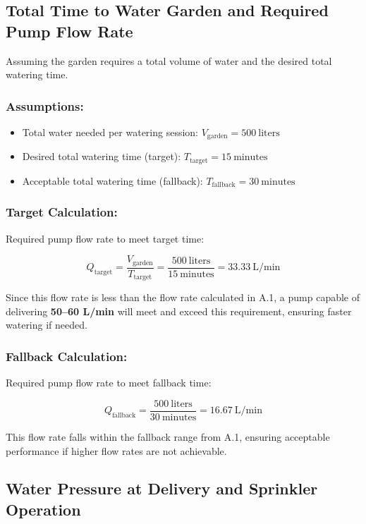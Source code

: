 \documentclass[12pt]{report}
\begin{document}
\subsection{Total Time to Water Garden and Required Pump Flow Rate}

Assuming the garden requires a total volume of water and the desired total watering time.

\subsubsection{Assumptions:}
\begin{itemize}
\item Total water needed per watering session: \( V_{\text{garden}} = 500\ \text{liters} \)
\item Desired total watering time (target): \( T_{\text{target}} = 15\ \text{minutes} \)
\item Acceptable total watering time (fallback): \( T_{\text{fallback}} = 30\ \text{minutes} \)
\end{itemize}

\subsubsection{Target Calculation:}

Required pump flow rate to meet target time:

\[
Q_{\text{target}} = \frac{V_{\text{garden}}}{T_{\text{target}}} = \frac{500\ \text{liters}}{15\ \text{minutes}} = 33.33\ \text{L/min}
\]

Since this flow rate is less than the flow rate calculated in A.1, a pump capable of delivering \textbf{50–60 L/min} will meet and exceed this requirement, ensuring faster watering if needed.

\subsubsection{Fallback Calculation:}

Required pump flow rate to meet fallback time:

\[
Q_{\text{fallback}} = \frac{500\ \text{liters}}{30\ \text{minutes}} = 16.67\ \text{L/min}
\]

This flow rate falls within the fallback range from A.1, ensuring acceptable performance if higher flow rates are not achievable.

\subsection{Water Pressure at Delivery and Sprinkler Operation}
\end{document}
